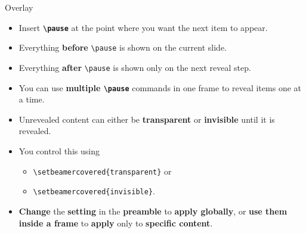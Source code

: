 \documentclass[aspectratio=169]{beamer}
\begin{document}
\begin{frame}{Overlay}
    \pause
    \vspace{0.5cm}
    \begin{minipage}[t]{0.49\textwidth}
        \begin{coloredblock}
            \begin{itemize}
                \item \footnotesize Insert \textbf{\texttt{\textbackslash pause}} at the point where you want the next item to appear.
                \item \footnotesize Everything \textbf{before} \texttt{\textbackslash pause} is shown on the current slide.
                \item \footnotesize Everything \textbf{after} \texttt{\textbackslash pause} is shown only on the next reveal step.
                \item \footnotesize You can use \textbf{multiple \texttt{\textbackslash pause}} commands in one frame to reveal items one at a time.
            \end{itemize}
        \end{coloredblock}
    \end{minipage}
    \hfill
    \pause
    \begin{minipage}[t]{0.49\textwidth}
        \begin{coloredblock}
            \begin{itemize}
               \item \footnotesize Unrevealed content can either be \textbf{transparent} or \textbf{invisible} until it is revealed.
                \item \footnotesize You control this using 
                \begin{itemize}
                    \item \texttt{\textbackslash setbeamercovered\{transparent\}} or
                    \item \texttt{\textbackslash setbeamercovered\{invisible\}}.
                \end{itemize}
                \item \footnotesize \textbf{Change} the \textbf{setting} in the \textbf{preamble} to \textbf{apply globally}, or \textbf{use them inside a frame} to \textbf{apply} only to \textbf{specific content}.
            \end{itemize}
        \end{coloredblock}
    \end{minipage}

\end{frame}
\end{document}

